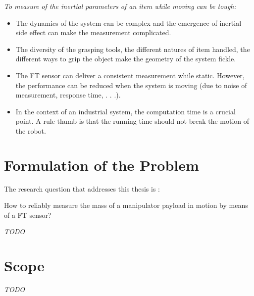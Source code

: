 \documentclass[/home/francois/latex/report/main.tex]{subfiles}
\begin{document}
{\it
To measure of the inertial parameters of an item while moving can be tough:

\begin{itemize}
	\item The dynamics of the system can be complex and the emergence of inertial side effect can make the measurement complicated.
	\item The diversity of the grasping tools, the different natures of item handled, the different ways to grip the object make the geometry of the system fickle.
	\item The \ac{FT} sensor can deliver a consistent measurement while static. However, the performance can be reduced when the system is moving (due to noise of measurement, response time, . . .).
	\item In the context of an industrial system, the computation time is a crucial point. A rule  thumb is that the running time should not break the motion of the robot.
\end{itemize}
}


\section{Formulation of the Problem}

The research question that addresses this thesis is :

How to reliably measure the mass of a manipulator payload in motion by means of a \ac{FT} sensor?

\textit{TODO}

\section{Scope}

\textit{TODO}

{\it

}
\end{document}
